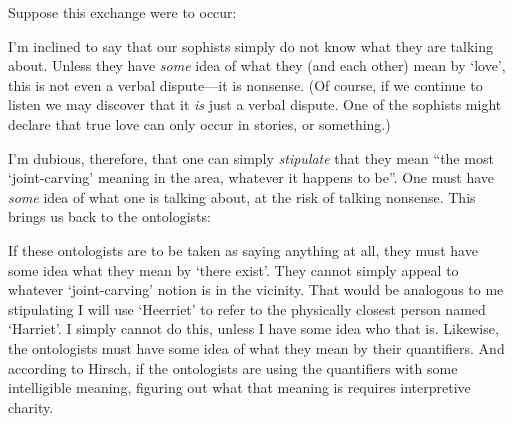 \documentclass[11pt]{article}
\begin{document}
\begin{spacing}{1.25}
Suppose this exchange were to occur:





I'm inclined to say that our sophists simply do not know what they are
talking about.  Unless they have {\em some} idea of what they (and
each other) mean by `love', this is not even a verbal dispute---it is
nonsense.  (Of course, if we continue to listen we may discover that
it {\em is} just a verbal dispute.  One of the sophists might declare that
true love can only occur in stories, or something.)

I'm dubious, therefore, that one can simply {\em stipulate} that they
mean ``the most `joint-carving' meaning in the area, whatever it
happens to be''.  One must have {\em some} idea of what one is talking
about, at the risk of talking nonsense.  This brings us back to the
ontologists:





If these ontologists are to be taken as saying anything at all, they
must have some idea what they mean by `there exist'.  They cannot
simply appeal to whatever `joint-carving' notion is in the vicinity.
That would be analogous to me stipulating I will use `Heerriet' to
refer to the physically closest person named `Harriet'.  I simply
cannot do this, unless I have some idea who that is.  Likewise, the
ontologists must have some idea of what they mean by their
quantifiers.  And according to Hirsch, if the ontologists are using
the quantifiers with some intelligible meaning, figuring out what that
meaning is requires interpretive charity.


\end{spacing}
\end{document}
